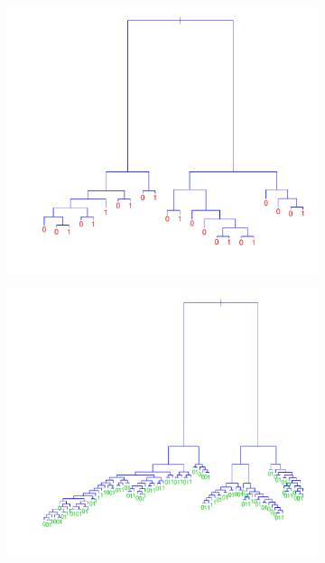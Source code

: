 \begin{figure}[h!tp]
  \centering
  \begin{subfigure}[b]{0.48\textwidth}
    \includegraphics[width=\textwidth]{./figures/cartSmallSpam.pdf}
  \end{subfigure}%
  \quad
  \begin{subfigure}[b]{0.48\textwidth}
    \includegraphics[width=\textwidth]{./figures/cartOptSpam.pdf}
  \end{subfigure}
  \quad

\end{figure}
